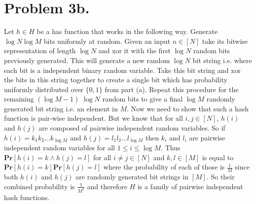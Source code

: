 \documentclass[12pt]{article}
\begin{document}
\newpage
\section*{Problem 3b.} Let $h \in H$ be a has function that works in the following
way. Generate $\log N \log M$ bits uniformly at random. Given an input
$n \in [N]$ take its bitwise representation of length $\log N$ and xor it with
the first $\log N$ random bits previously generated. This will generate a new
random $\log N$ bit string i.e. where each bit is a independent binary random
variable. Take this bit string and xor the bits in this string together to
create a single bit which has probability uniformly distributed over $\{0,1\}$
from part (a). Repeat this procedure for the remaining $(\log M - 1)$ $\log N$
random bits to give a final $\log M$ randomly generated bit string i.e. an
element in $M$. Now we need to show that such a hash function is pair-wise
independent. But we know that for all $i,j \in [N]$, $h(i)$ and $h(j)$ are
composed of pairwise independent random variables. So if
$h(i) = k_1k_2...k_{\log M}$ and $h(j) = l_1l_2...l_{\log M}$ then $k_i$ and
$l_i$ are pairwise independent random variables for all $1 \le i \le \log M$.
Thus $\textbf{Pr}[h(i) = k \wedge h(j) = l]$ for all $i \neq j \in [N]$ and
$k,l \in [M]$ is equal to $\textbf{Pr}[h(i) = k]\textbf{Pr}[h(j) = l]$ where the
probability of each of those is $\frac{1}{M}$ since both $h(i)$ and $h(j)$
are randomly generated bit strings in $[M]$. So their combined probability is
$\frac{1}{M^2}$ and therefore $H$ is a family of pairwise independent hash
functions.

\newpage
\end{document}
